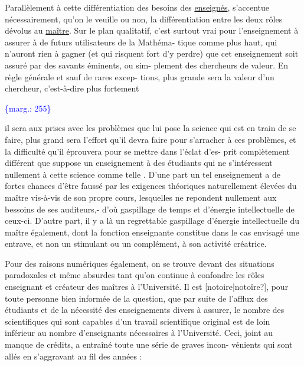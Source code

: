 \documentclass[11pt]{article}
\newcommand{\scanpage}[1]{\par\bigskip\noindent{\small\sffamily[scan #1]}\par}
\newcommand{\mspage}[1]{{\small\sffamily[p.\,#1]}}
\newcommand{\margin}[1]{\textcolor{blue}{\{\textsf{marg.:} #1\}}}
\newcommand{\uline}[1]{\underline{#1}}
\newcommand{\unsure}[1]{[#1?]}
\begin{document}
Parallèlement à cette différentiation des besoins des \uline{enseignés},
s'accentue nécessairement, qu'on le veuille ou non, la différentiation entre
les deux rôles dévolus au \uline{maître}. Sur le plan qualitatif, c'est surtout
vrai pour l'enseignement à assurer à de futurs utilisateurs de la Mathéma-%
tique comme plus haut, qui n'auront rien à gagner (et qui risquent fort d'y
perdre) que cet enseignement soit assuré par des savants éminents, ou sim-%
plement des chercheurs de valeur. En règle générale et sauf de rares excep-%
tions, plus grande sera la valeur d'un chercheur, c'est-à-dire plus fortement

\margin{255}

\clearpage
\scanpage{119/256}
\mspage{3}

il sera aux prises avec les problèmes que lui pose la science qui est en train
de se faire, plus grand sera l'effort qu'il devra faire pour s'arracher à ces
problèmes, et la difficulté qu'il éprouvera pour se mettre dans l'éclat d'es-%
prit complètement différent que suppose un enseignement à des étudiants qui
ne s'intéressent nullement à cette science comme telle . D'une part un tel
enseignement a de fortes chances d'être faussé par les exigences théoriques
naturellement élevées du maître vis-à-vis de son propre cours, lesquelles
ne repondent nullement aux bessoins de ses auditeurs,- d'où gaspillage de
temps et d'énergie intellectuelle de ceux-ci. D'autre part, il y a là un
regrettable gaspillage d'énergie intellectuelle du maître également, dont
la fonction enseignante constitue dans le cas envisagé une entrave, et non
un stimulant ou un complément, à son activité créatrice.

Pour des raisons numériques également, on se trouve devant des
situations paradoxales et même absurdes tant qu'on continue à confondre les
rôles enseignant et créateur des maîtres à l'Université. Il est \unsure{notoire|notoîre},
pour toute personne bien informée de la question, que par suite de l'afflux
des étudiants et de la nécessité des enseignements divers à assurer, le
nombre des scientifiques qui sont capables d'un travail scientifique original
est de loin inférieur au nombre d'enseignants nécessaires à l'Université.
Ceci, joint au manque de crédits, a entraîné toute une série de graves incon-%
vénients qui sont allés en s'aggravant au fil des années :
\end{document}
